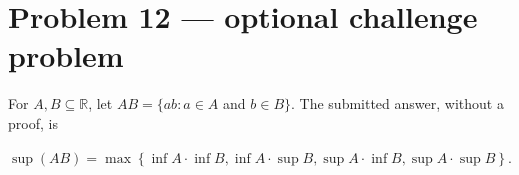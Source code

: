 \clearpage

\section{Problem 12 --- optional challenge problem}

For \(A,B \subseteq \mathbb{R}\), let \(AB = \{ ab:a \in A\) and \(b \in B\}\). The submitted answer, without a proof, is

\(\sup\left( {AB} \right) = \max\left\{ {\inf A \cdot \inf B,\inf A \cdot \sup B,\sup A \cdot \inf B,\sup A \cdot \sup B} \right\}\).

